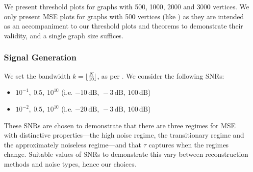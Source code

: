 We present threshold plots for graphs with 500, 1000, 2000 and 3000 vertices. We only present MSE plots for graphs with 500 vertices  {\color{black}  (like \cite[Fig 8]{bai2020fast})} as they are intended as an accompaniment to our threshold plots and theorems to demonstrate their validity, and a single graph size suffices. 

\subsubsection{ Signal Generation}
We set the bandwidth  $k = \lfloor \frac{N}{10} \rfloor$, as per \cite{bai2020fast}.  We consider the following SNRs:

\begin{itemize}
    \item {} $10^{-1},\ 0.5,\ 10^{10}$ (i.e. $-10\,\mathrm{dB},\ -3\,\mathrm{dB},\ 100\,\mathrm{dB}$)
    \item {} $10^{-2},\ 0.5,\ 10^{10}$ (i.e. $-20\,\mathrm{dB},\ -3\,\mathrm{dB},\ 100\,\mathrm{dB}$)
\end{itemize}




These SNRs are chosen to demonstrate that there are three regimes for MSE with distinctive properties---the high noise regime, the transitionary regime and the approximately noiseless regime---and that $\tau$ captures when the regimes change. Suitable values of SNRs to demonstrate this vary between reconstruction methods and noise types, hence our choices.

